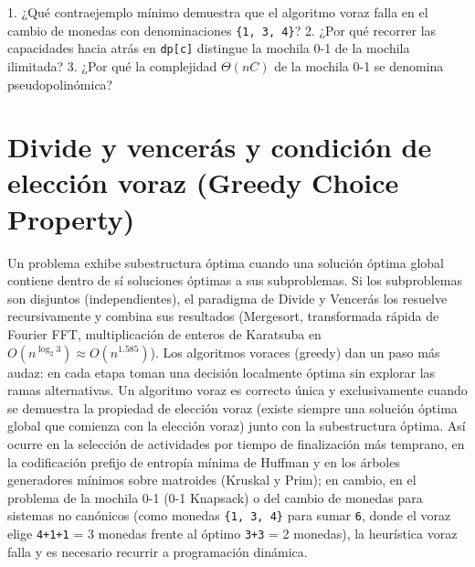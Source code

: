 \documentclass{book}
\begin{document}
\begin{tcolorbox}[title={Autoficha}, studiumcheck, breakable]

1. ¿Qué contraejemplo mínimo demuestra que el algoritmo voraz falla en el cambio de monedas con denominaciones \texttt{\{1, 3, 4\}}? 2. ¿Por qué recorrer las capacidades hacia atrás en \texttt{dp[c]} distingue la mochila 0-1 de la mochila ilimitada? 3. ¿Por qué la complejidad \(\Theta(n C)\) de la mochila 0-1 se denomina pseudopolinómica?
\end{tcolorbox}

\section{Divide y vencerás y condición de elección voraz (Greedy Choice Property)}

Un problema exhibe subestructura óptima cuando una solución óptima global contiene dentro de sí soluciones óptimas a sus subproblemas. Si los subproblemas son disjuntos (independientes), el paradigma de Divide y Vencerás los resuelve recursivamente y combina sus resultados (Mergesort, transformada rápida de Fourier FFT, multiplicación de enteros de Karatsuba en \(O(n^{\log_2 3}) \approx O(n^{1.585})\)).
Los algoritmos voraces (greedy) dan un paso más audaz: en cada etapa toman una decisión localmente óptima sin explorar las ramas alternativas. Un algoritmo voraz es correcto única y exclusivamente cuando se demuestra la propiedad de elección voraz (existe siempre una solución óptima global que comienza con la elección voraz) junto con la subestructura óptima. Así ocurre en la selección de actividades por tiempo de finalización más temprano, en la codificación prefijo de entropía mínima de Huffman y en los árboles generadores mínimos sobre matroides (Kruskal y Prim); en cambio, en el problema de la mochila 0-1 (0-1 Knapsack) o del cambio de monedas para sistemas no canónicos (como monedas \texttt{\{1, 3, 4\}} para sumar \texttt{6}, donde el voraz elige \texttt{4+1+1} = 3 monedas frente al óptimo \texttt{3+3} = 2 monedas), la heurística voraz falla y es necesario recurrir a programación dinámica.
\end{document}
